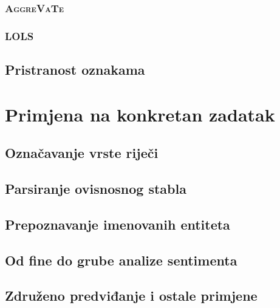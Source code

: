 \documentclass[times, utf8, diplomski]{fer}
\begin{document}
\subsection{\textsc{AggreVaTe}}\label{ch:aggrevate}


\subsection{\textsc{LOLS}}\label{ch:LOLS}


\section{Pristranost oznakama}\label{ch:labelbias}


\chapter{Primjena na konkretan zadatak}\label{ch:applications}

\section{Označavanje vrste riječi}\label{ch:postaggingapp}


\section{Parsiranje ovisnosnog stabla}


\section{Prepoznavanje imenovanih entiteta}


\section{Od fine do grube analize sentimenta}


\section{Združeno predviđanje i ostale primjene}

\end{document}
